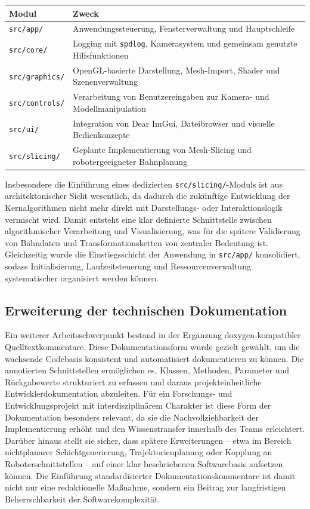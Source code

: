 \documentclass[
	paper=a4,
	fontsize=11pt,
	parskip=half,
	headings=normal,
	bibliography=totoc,
	listof=totoc
]{scrartcl}
\begin{document}
	\begin{table}[h]
		\centering
		\begin{tabular}{ll}
			\toprule
			\textbf{Modul} & \textbf{Zweck} \\
			\midrule
			\texttt{src/app/} & Anwendungssteuerung, Fensterverwaltung und Hauptschleife \\
			\texttt{src/core/} & Logging mit \texttt{spdlog}, Kamerasystem und gemeinsam genutzte Hilfsfunktionen \\
			\texttt{src/graphics/} & OpenGL-basierte Darstellung, Mesh-Import, Shader und Szenenverwaltung \\
			\texttt{src/controls/} & Verarbeitung von Benutzereingaben zur Kamera- und Modellmanipulation \\
			\texttt{src/ui/} & Integration von Dear ImGui, Dateibrowser und visuelle Bedienkonzepte \\
			\texttt{src/slicing/} & Geplante Implementierung von Mesh-Slicing und robotergeeigneter Bahnplanung \\
			\bottomrule
		\end{tabular}
	\end{table}

	Insbesondere die Einführung eines dedizierten \texttt{src/slicing/}-Moduls ist aus architektonischer Sicht wesentlich, da dadurch die zukünftige Entwicklung der Kernalgorithmen nicht mehr direkt mit Darstellungs- oder Interaktionslogik vermischt wird.
	Damit entsteht eine klar definierte Schnittstelle zwischen algorithmischer Verarbeitung und Visualisierung, was für die spätere Validierung von Bahndaten und Transformationsketten von zentraler Bedeutung ist.
	Gleichzeitig wurde die Einstiegsschicht der Anwendung in \texttt{src/app/} konsolidiert, sodass Initialisierung, Laufzeitsteuerung und Ressourcenverwaltung systematischer organisiert werden können.

\subsection{Erweiterung der technischen Dokumentation}
	Ein weiterer Arbeitsschwerpunkt bestand in der Ergänzung doxygen-kompatibler Quelltextkommentare.
	Diese Dokumentationsform wurde gezielt gewählt, um die wachsende Codebasis konsistent und automatisiert dokumentieren zu können.
	Die annotierten Schnittstellen ermöglichen es, Klassen, Methoden, Parameter und Rückgabewerte strukturiert zu erfassen und daraus projekteinheitliche Entwicklerdokumentation abzuleiten.
	Für ein Forschungs- und Entwicklungsprojekt mit interdisziplinärem Charakter ist diese Form der Dokumentation besonders relevant, da sie die Nachvollziehbarkeit der Implementierung erhöht und den Wissenstransfer innerhalb des Teams erleichtert.
	Darüber hinaus stellt sie sicher, dass spätere Erweiterungen -- etwa im Bereich nichtplanarer Schichtgenerierung, Trajektorienplanung oder Kopplung an Roboterschnittstellen -- auf einer klar beschriebenen Softwarebasis aufsetzen können.
	Die Einführung standardisierter Dokumentationskommentare ist damit nicht nur eine redaktionelle Maßnahme, sondern ein Beitrag zur langfristigen Beherrschbarkeit der Softwarekomplexität.
\end{document}
